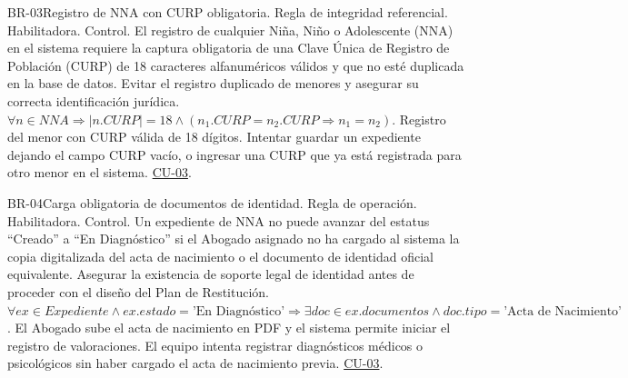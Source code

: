 \begin{BussinesRule}{BR-03}{Registro de NNA con CURP obligatoria.}
	\BRitem[Tipo:] Regla de integridad referencial. 
	\BRitem[Clase:] Habilitadora. 
	\BRitem[Nivel:] Control.
	\BRitem[Descripción:] El registro de cualquier Niña, Niño o Adolescente (NNA) en el sistema requiere la captura obligatoria de una Clave Única de Registro de Población (CURP) de 18 caracteres alfanuméricos válidos y que no esté duplicada en la base de datos.
	\BRitem[Motivación:] Evitar el registro duplicado de menores y asegurar su correcta identificación jurídica.
	\BRitem[Sentencia:] $\forall n \in NNA \Rightarrow |n.CURP| = 18 \land (n_1.CURP = n_2.CURP \Rightarrow n_1 = n_2)$.
	 Registro del menor con CURP válida de 18 dígitos.
	 Intentar guardar un expediente dejando el campo CURP vacío, o ingresar una CURP que ya está registrada para otro menor en el sistema.
	 \hyperlink{CU-03}{CU-03}.
\end{BussinesRule}

\begin{BussinesRule}{BR-04}{Carga obligatoria de documentos de identidad.}
	\BRitem[Tipo:] Regla de operación. 
	\BRitem[Clase:] Habilitadora. 
	\BRitem[Nivel:] Control.
	\BRitem[Descripción:] Un expediente de NNA no puede avanzar del estatus ``Creado'' a ``En Diagnóstico'' si el Abogado asignado no ha cargado al sistema la copia digitalizada del acta de nacimiento o el documento de identidad oficial equivalente.
	\BRitem[Motivación:] Asegurar la existencia de soporte legal de identidad antes de proceder con el diseño del Plan de Restitución.
	\BRitem[Sentencia:] $\forall ex \in Expediente \land ex.estado = \mbox{'En Diagnóstico'} \Rightarrow \exists doc \in ex.documentos \land doc.tipo = \mbox{'Acta de Nacimiento'}$.
	 El Abogado sube el acta de nacimiento en PDF y el sistema permite iniciar el registro de valoraciones.
	 El equipo intenta registrar diagnósticos médicos o psicológicos sin haber cargado el acta de nacimiento previa.
	 \hyperlink{CU-03}{CU-03}.
\end{BussinesRule}

